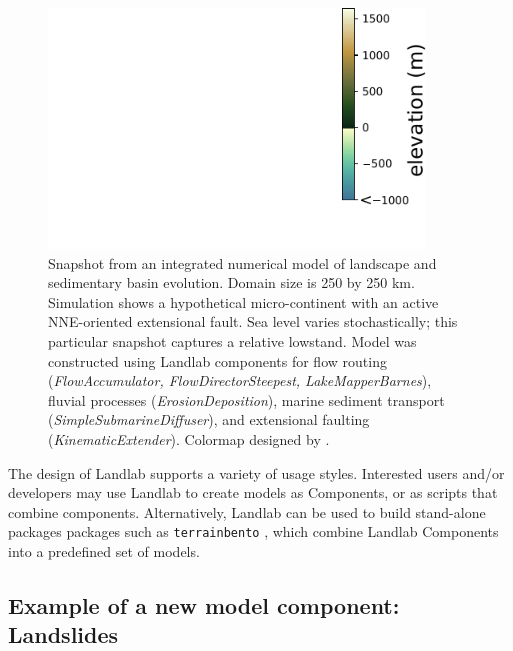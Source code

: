 \documentclass[12pt]{amsart}
\begin{document}
\begin{figure}
\includegraphics[width=10cm]{Figures/rift_island.pdf}
\caption{Snapshot from an integrated numerical model of landscape and sedimentary basin evolution. Domain size is 250 by 250 km. Simulation shows a hypothetical micro-continent with an active NNE-oriented extensional fault. Sea level varies stochastically; this particular snapshot captures a relative lowstand. Model was constructed using Landlab components for flow routing (\textit{FlowAccumulator, FlowDirectorSteepest, LakeMapperBarnes}), fluvial processes (\textit{ErosionDeposition}), marine sediment transport (\textit{SimpleSubmarineDiffuser}), and extensional faulting (\textit{KinematicExtender}). Colormap designed by \citet{thyng2016true}.}
\label{fig:riftisland}
\end{figure}

The design of Landlab supports a variety of usage styles. Interested users and/or developers may use Landlab to create models as Components, or as scripts that combine components. Alternatively, Landlab can be used to build stand-alone packages packages such as \texttt{terrainbento} \citep{barnhart2019terrainbento}, which combine Landlab Components into a predefined set of models.




\subsection{Example of a new model component: Landslides}
  
\end{document}
